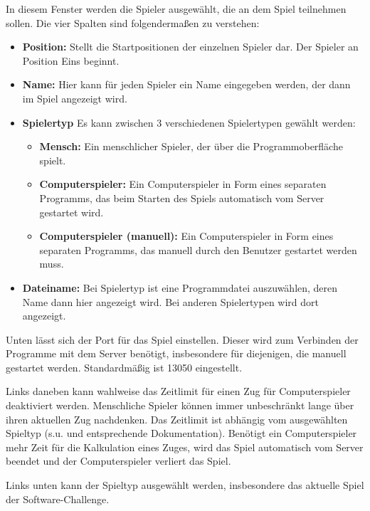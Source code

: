 \documentclass[11pt,pointlessnumbers,DIV10,BCOR10mm,tocleft]{scrreprt}
\begin{document}
In diesem Fenster werden die Spieler ausgewählt, die an dem Spiel teilnehmen sollen.
Die vier Spalten sind folgendermaßen zu verstehen:

\begin{itemize}
\item \textbf{Position:} Stellt die Startpositionen der einzelnen Spieler dar. Der Spieler an Position Eins beginnt.
\item \textbf{Name:} Hier kann für jeden Spieler ein Name eingegeben werden, der dann im Spiel angezeigt wird.
\item \textbf{Spielertyp} Es kann zwischen 3 verschiedenen Spielertypen gewählt werden:
\begin{itemize}
\item \textbf{Mensch:} Ein menschlicher Spieler, der über die Programmoberfläche spielt.
\item \textbf{Computerspieler:}  Ein Computerspieler in Form eines separaten Programms, das beim Starten des Spiels automatisch vom Server gestartet wird.
\item \textbf{Computerspieler (manuell):}  Ein Computerspieler in Form eines separaten Programms, das manuell durch den Benutzer gestartet werden muss.
\end{itemize}
\item \textbf{Dateiname:} Bei Spielertyp  ist eine Programmdatei auszuwählen, deren Name dann hier angezeigt wird. Bei anderen
Spielertypen wird dort \glqq{--\grqq} angezeigt.
\end{itemize}

Unten lässt sich der Port für das Spiel einstellen. Dieser wird zum Verbinden der Programme
mit dem Server benötigt, insbesondere für diejenigen, die manuell gestartet werden.
Standardmäßig ist 13050 eingestellt.

Links daneben kann wahlweise das Zeitlimit für einen Zug für Computerspieler deaktiviert
werden. Menschliche Spieler können immer unbeschränkt lange über ihren aktuellen Zug
nachdenken. Das Zeitlimit ist abhängig vom ausgewählten Spieltyp (s.u. und entsprechende
Dokumentation). Benötigt ein Computerspieler mehr Zeit für die Kalkulation eines Zuges,
wird das Spiel automatisch vom Server beendet und der Computerspieler verliert das Spiel.

Links unten kann der Spieltyp ausgewählt werden, insbesondere das aktuelle Spiel der Software-Challenge.
\end{document}
